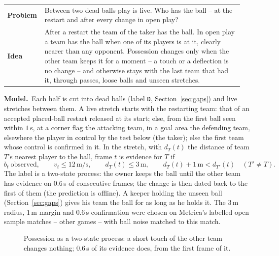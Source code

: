 \documentclass[11pt,a4paper]{article}
\makeatletter
\newcommand{\triple}[3]{%
  \par\medskip\noindent
  \begin{tabular}{@{}p{0.13\linewidth}@{\hspace{0.6em}}p{0.82\linewidth}@{}}
  \textbf{Problem} & #1\\[0.3em]
  \textbf{Idea}    & #2
  \end{tabular}\par\smallskip\noindent
  \textbf{Model.}\ #3\par\medskip}
\makeatother
\begin{document}
\triple{Between two dead balls play is live. Who has the ball -- at the restart and after every
change in open play?}
{After a restart the team of the taker has the ball. In open play a team has the ball when
one of its players is at it, clearly nearer than any opponent. Possession changes only when
the other team keeps it for a moment -- a touch or a deflection is no change -- and otherwise
stays with the last team that had it, through passes, loose balls and unseen stretches.}
{Each half is cut into dead balls (label \texttt{D}, Section~\ref{sec:gaps}) and live
stretches between them. A live stretch starts with the restarting team: that of an accepted
placed-ball restart released at its start; else, from the first ball seen within $1$\,s, at a
corner flag the attacking team, in a goal area the defending team, elsewhere the player in
control by the test below (the taker); else the first team whose control is confirmed in it.
In the stretch, with $d_T(t)$ the distance of team
$T$'s nearest player to the ball, frame $t$ is evidence for $T$ if
\begin{equation}
  b_t\ \text{observed},\qquad v_t\le 12\,\text{m/s},\qquad d_T(t)\le 3\,\text{m},\qquad
  d_T(t)+1\,\text{m}<d_{T'}(t)\quad(T'\neq T).
\end{equation}
The label is a two-state process: the owner keeps the ball until the other team has
evidence on $0.6$\,s of consecutive frames; the change is then dated back to the first of
them (the prediction is offline). A keeper holding the unseen ball (Section~\ref{sec:gaps})
gives his team the ball for as long as he holds it. The $3$\,m radius, $1$\,m margin and $0.6$\,s confirmation
were chosen on Metrica's labelled open sample matches -- other games -- with ball noise
matched to this match.}

\begin{figure}[ht]
\centering
{}
\caption{Possession as a two-state process: a short touch of the other team changes nothing;
$0.6$\,s of its evidence does, from the first frame of it.}
\end{figure}
\end{document}
